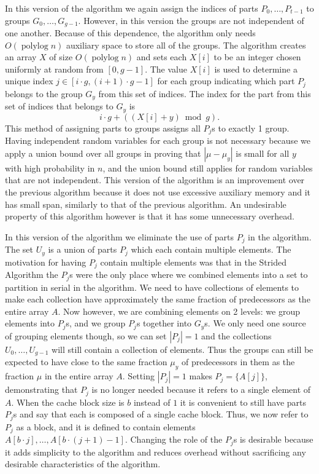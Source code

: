 \documentclass[twocolumn, twoside, 12pt]{article}
\def\polylog{\operatorname{polylog}}
\renewcommand{\paragraph}[1]{\vspace{0.09in}\noindent{\bf \boldmath #1.}}
\begin{document}
\paragraph{Version 2}
In this version of the algorithm we again assign the indices of parts $P_0,\ldots, P_{t-1}$ to groups $G_0,\ldots, G_{g-1}$.
However, in this version the groups are not independent of one another.
Because of this dependence, the algorithm only needs $O(\polylog n)$ auxiliary space to store all of the groups.
The algorithm creates an array $X$ of size $O(\polylog n)$ and sets each $X[i]$ to be an integer chosen uniformly at random from $[0,g-1]$.
The value $X[i]$ is used to determine a unique index $j \in [i\cdot g, (i+1)\cdot g-1]$ for each group indicating which part $P_j$ belongs to the group $G_y$ from this set of indices.
The index for the part from this set of indices that belongs to $G_y$ is $$i \cdot g + ((X[i]+y)\bmod g).$$ 
This method of assigning parts to groups assigns all $P_j$s to exactly 1 group.
Having independent random variables for each group is not necessary because we apply a union bound over all groups in proving that $|\mu - \mu_y|$ is small for all $y$ with high probability in $n$, and the union bound still applies for random variables that are not independent.
This version of the algorithm is an improvement over the previous algorithm because it does not use excessive auxiliary memory and it has small span, similarly to that of the previous algorithm. 
An undesirable property of this algorithm however is that it has some unnecessary overhead.

\paragraph{Version 3}
In this version of the algorithm we eliminate the use of parts $P_j$ in the algorithm.
The set $U_y$ is a union of parts $P_j$ which each contain multiple elements.
The motivation for having $P_j$ contain multiple elements was that in the Strided Algorithm the $P_j$s were the only place where we combined elements into a set to partition in serial in the algorithm.
We need to have collections of elements to make each collection have approximately the same fraction of predecessors as the entire array $A$.
Now however, we are combining elements on 2 levels: we group elements into $P_j$s, and we group $P_j$s together into $G_y$s.
We only need one source of grouping elements though, so we can set $|P_j| = 1$ and the collections $U_0,\ldots,U_{g-1}$ will still contain a collection of elements.
Thus the groups can still be expected to have close to the same fraction $\mu_y$ of predecessors in them as the fraction $\mu$ in the entire array $A$.
Setting $|P_j|=1$ makes $P_j=\{A[j]\}$, demonstrating that $P_j$ is no longer needed because it refers to a single element of $A$.
When the cache block size is $b$ instead of $1$ it is convenient to still have parts $P_j$s and say that each is composed of a single cache block.
Thus, we now refer to $P_j$ as a block, and it is defined to contain elements $A[b\cdot j],\ldots, A[b\cdot (j+1) - 1]$.
Changing the role of the $P_j$s is desirable because it adds simplicity to the algorithm and reduces overhead without sacrificing any desirable characteristics of the algorithm.
\end{document}
